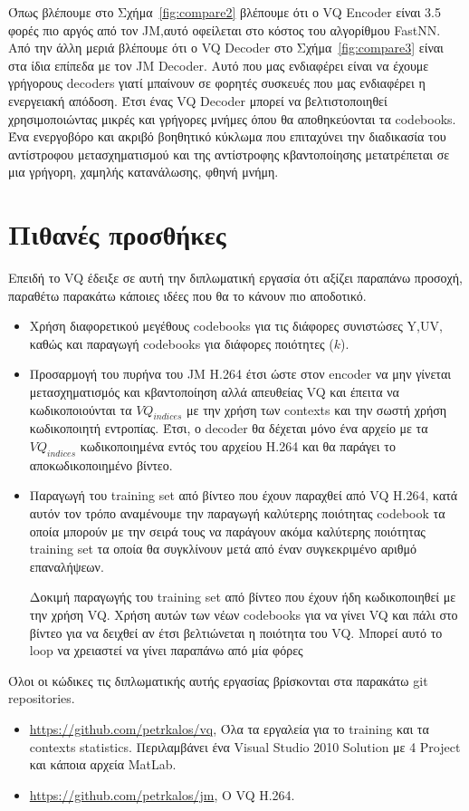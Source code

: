 \indent Όπως βλέπουμε στο Σχήμα~\ref{fig:compare2} βλέπουμε ότι ο VQ Encoder είναι 3.5 φορές πιο αργός από τον JM,αυτό οφείλεται στο κόστος του αλγορίθμου FastNN. Από την άλλη μεριά βλέπουμε ότι ο VQ Decoder στο Σχήμα~\ref{fig:compare3} είναι στα ίδια επίπεδα με τον JM Decoder. Αυτό που μας ενδιαφέρει είναι να έχουμε γρήγορους decoders γιατί μπαίνουν σε φορητές συσκευές που μας ενδιαφέρει η ενεργειακή απόδοση. Έτσι ένας VQ Decoder μπορεί να βελτιστοποιηθεί χρησιμοποιώντας μικρές και γρήγορες μνήμες όπου θα αποθηκεύονται τα codebooks. Ένα ενεργοβόρο και ακριβό βοηθητικό κύκλωμα που επιταχύνει την διαδικασία του αντίστροφου μετασχηματισμού και της αντίστροφης κβαντοποίησης μετατρέπεται σε μια γρήγορη, χαμηλής κατανάλωσης, φθηνή μνήμη.

\section{Πιθανές προσθήκες}
\label{section:sect63}

\indent Επειδή το VQ έδειξε σε αυτή την διπλωματική εργασία ότι αξίζει παραπάνω προσοχή, παραθέτω παρακάτω κάποιες ιδέες που θα το κάνουν πιο αποδοτικό.

\begin{itemize}

    \item Χρήση διαφορετικού μεγέθους codebooks για τις διάφορες συνιστώσες Y,UV, καθώς και παραγωγή codebooks για διάφορες ποιότητες ($k$).

    \item Προσαρμογή του πυρήνα του JM H.264 έτσι ώστε στον encoder να μην γίνεται μετασχηματισμός και κβαντοποίηση αλλά απευθείας VQ και έπειτα να κωδικοποιούνται τα $VQ_{indices}$ με την χρήση των contexts και την σωστή χρήση κωδικοποιητή εντροπίας. Έτσι, ο decoder θα δέχεται μόνο ένα αρχείο με τα $VQ_{indices}$ κωδικοποιημένα εντός του αρχείου H.264 και θα παράγει το αποκωδικοποιημένο βίντεο.

    \item Παραγωγή του training set από βίντεο που έχουν παραχθεί από VQ H.264, κατά αυτόν τον τρόπο αναμένουμε την παραγωγή καλύτερης ποιότητας codebook τα οποία μπορούν με την σειρά τους να παράγουν ακόμα καλύτερης ποιότητας training set τα οποία θα συγκλίνουν μετά από έναν συγκεκριμένο αριθμό επαναλήψεων.
    
    Δοκιμή παραγωγής του training set από βίντεο που έχουν ήδη κωδικοποιηθεί με την χρήση VQ. Χρήση αυτών των νέων codebooks για να γίνει VQ και πάλι στο βίντεο για να δειχθεί αν έτσι βελτιώνεται η ποιότητα του VQ. Μπορεί αυτό το loop να χρειαστεί να γίνει παραπάνω από μία φόρες
\end{itemize}

\indent Όλοι οι κώδικες τις διπλωματικής αυτής εργασίας βρίσκονται στα παρακάτω git repositories.
\begin{itemize}
    \item \url{https://github.com/petrkalos/vq}, Όλα τα εργαλεία για το training και τα contexts statistics. Περιλαμβάνει ένα Visual Studio 2010 Solution με 4 Project και κάποια αρχεία MatLab.

    \item \url{https://github.com/petrkalos/jm}, Ο VQ H.264.
\end{itemize} 